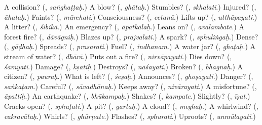 \begin{tcolorbox}[breakable,colback=teal!4,colframe=teal!35!black,title={Before you move on}]
A collision? (\textbf{}, \emph{saṅghaṭṭaḥ}.) A blow? (\textbf{}, \emph{ghātaḥ}.) Stumbles? (\textbf{}, \emph{skhalati}.) Injured? (\textbf{}, \emph{āhataḥ}.) Faints? (\textbf{}, \emph{mūrchati}.) Consciousness? (\textbf{}, \emph{cetanā}.) Lifts up? (\textbf{}, \emph{utthāpayati}.) A litter? (\textbf{}, \emph{śibikā}.) An emergency? (\textbf{}, \emph{āpatkālaḥ}.) Leans on? (\textbf{}, \emph{avalambate}.) A forest fire? (\textbf{}, \emph{dāvāgniḥ}.) Blazes up? (\textbf{}, \emph{prajvalati}.) A spark? (\textbf{}, \emph{sphuliṅgaḥ}.) Dense? (\textbf{}, \emph{gāḍhaḥ}.) Spreads? (\textbf{}, \emph{prasarati}.) Fuel? (\textbf{}, \emph{indhanam}.) A water jar? (\textbf{}, \emph{ghaṭaḥ}.) A stream of water? (\textbf{}, \emph{dhārā}.) Puts out a fire? (\textbf{}, \emph{nirvāpayati}.) Dies down? (\textbf{}, \emph{śāmyati}.) Damage? (\textbf{}, \emph{kṣatiḥ}.) Destroys? (\textbf{}, \emph{nāśayati}.) Broken? (\textbf{}, \emph{bhagnaḥ}.) A citizen? (\textbf{}, \emph{pauraḥ}.) What is left? (\textbf{}, \emph{śeṣaḥ}.) Announces? (\textbf{}, \emph{ghoṣayati}.) Danger? (\textbf{}, \emph{saṅkaṭam}.) Careful? (\textbf{}, \emph{sāvadhānaḥ}.) Keeps away? (\textbf{}, \emph{nivārayati}.) A misfortune? (\textbf{}, \emph{āpattiḥ}.) An earthquake? (\textbf{}, \emph{bhūkampaḥ}.) Shakes? (\textbf{}, \emph{kampate}.) Slightly? (\textbf{}, \emph{īṣat}.) Cracks open? (\textbf{}, \emph{sphuṭati}.) A pit? (\textbf{}, \emph{gartaḥ}.) A cloud? (\textbf{}, \emph{meghaḥ}.) A whirlwind? (\textbf{}, \emph{cakravātaḥ}.) Whirls? (\textbf{}, \emph{ghūrṇate}.) Flashes? (\textbf{}, \emph{sphurati}.) Uproots? (\textbf{}, \emph{unmūlayati}.)
\end{tcolorbox}
